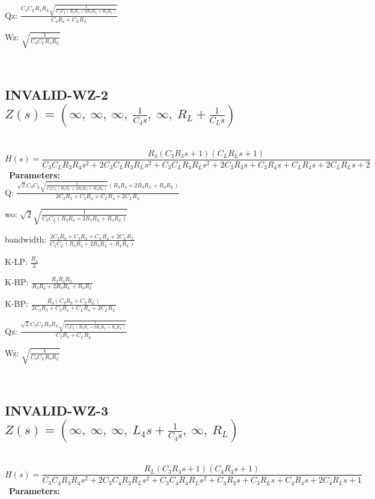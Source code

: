 \documentclass{article}
\begin{document}
Qz: $\frac{C_{4} C_{L} R_{4} R_{L} \sqrt{\frac{1}{C_{4} C_{L} \left(R_{3} R_{4} + 2 R_{3} R_{L} + R_{4} R_{L}\right)}}}{C_{4} R_{4} + C_{L} R_{L}}$\ 

Wz: $\sqrt{\frac{1}{C_{4} C_{L} R_{4} R_{L}}}$\ 

\ 

\subsection{INVALID-WZ-2 $Z(s) = \left( \infty, \  \infty, \  \infty, \  \frac{1}{C_{4} s}, \  \infty, \  R_{L} + \frac{1}{C_{L} s}\right)$ } \ 
\textbf{\[H(s) = \frac{R_{4} \left(C_{3} R_{3} s + 1\right) \left(C_{L} R_{L} s + 1\right)}{C_{3} C_{L} R_{3} R_{4} s^{2} + 2 C_{3} C_{L} R_{3} R_{L} s^{2} + C_{3} C_{L} R_{4} R_{L} s^{2} + 2 C_{3} R_{3} s + C_{3} R_{4} s + C_{L} R_{4} s + 2 C_{L} R_{L} s + 2}\] } \ 
\textbf{Parameters:}\\ 

Q: $\frac{\sqrt{2} C_{3} C_{L} \sqrt{\frac{1}{C_{3} C_{L} \left(R_{3} R_{4} + 2 R_{3} R_{L} + R_{4} R_{L}\right)}} \left(R_{3} R_{4} + 2 R_{3} R_{L} + R_{4} R_{L}\right)}{2 C_{3} R_{3} + C_{3} R_{4} + C_{L} R_{4} + 2 C_{L} R_{L}}$\ 

wo: $\sqrt{2} \sqrt{\frac{1}{C_{3} C_{L} \left(R_{3} R_{4} + 2 R_{3} R_{L} + R_{4} R_{L}\right)}}$\ 

bandwidth: $\frac{2 C_{3} R_{3} + C_{3} R_{4} + C_{L} R_{4} + 2 C_{L} R_{L}}{C_{3} C_{L} \left(R_{3} R_{4} + 2 R_{3} R_{L} + R_{4} R_{L}\right)}$\ 

K-LP: $\frac{R_{4}}{2}$\ 

K-HP: $\frac{R_{3} R_{4} R_{L}}{R_{3} R_{4} + 2 R_{3} R_{L} + R_{4} R_{L}}$\ 

K-BP: $\frac{R_{4} \left(C_{3} R_{3} + C_{L} R_{L}\right)}{2 C_{3} R_{3} + C_{3} R_{4} + C_{L} R_{4} + 2 C_{L} R_{L}}$\ 

Qz: $\frac{\sqrt{2} C_{3} C_{L} R_{3} R_{L} \sqrt{\frac{1}{C_{3} C_{L} \left(R_{3} R_{4} + 2 R_{3} R_{L} + R_{4} R_{L}\right)}}}{C_{3} R_{3} + C_{L} R_{L}}$\ 

Wz: $\sqrt{\frac{1}{C_{3} C_{L} R_{3} R_{L}}}$\ 

\ 

\subsection{INVALID-WZ-3 $Z(s) = \left( \infty, \  \infty, \  \infty, \  L_{4} s + \frac{1}{C_{4} s}, \  \infty, \  R_{L}\right)$ } \ 
\textbf{\[H(s) = \frac{R_{L} \left(C_{3} R_{3} s + 1\right) \left(C_{4} R_{4} s + 1\right)}{C_{3} C_{4} R_{3} R_{4} s^{2} + 2 C_{3} C_{4} R_{3} R_{L} s^{2} + C_{3} C_{4} R_{4} R_{L} s^{2} + C_{3} R_{3} s + C_{3} R_{L} s + C_{4} R_{4} s + 2 C_{4} R_{L} s + 1}\] } \ 
\textbf{Parameters:}\\ 
\end{document}

